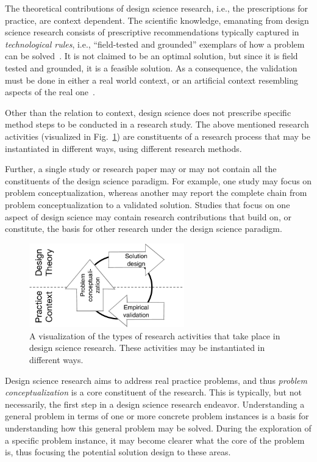 \documentclass[graybox]{svmult}
\begin{document}
The theoretical contributions of design science research, i.e., the prescriptions for practice, are context dependent. The scientific knowledge, emanating from design science research consists of prescriptive recommendations typically captured in \emph{technological rules}, i.e., ``field-tested and grounded'' exemplars of how a problem can be solved~\citep{van_aken_management_2004}. It is not claimed to be an optimal solution, but since it is field tested and grounded, it is a feasible solution.
As a consequence, the validation must be done in either a real world context, or an artificial context resembling aspects of the real one~\citep{wieringa_what_2014}.  

Other than the relation to context, design science does not prescribe specific method steps to be conducted in a research study. The above mentioned research activities (visualized in Fig.~\ref{fig:DS_process}) are constituents of a research process that may be instantiated in different ways, using different research methods. 

Further, a single study or research paper may or may not contain all the constituents of the design science paradigm. For example, one study may focus on problem conceptualization, whereas another may report the complete chain from problem conceptualization to a validated solution. Studies that focus on one aspect of design science may contain research contributions that build on, or constitute, the basis for other research under the design science paradigm.


\begin{figure}[t]
\centering
 \includegraphics[width=0.6\textwidth]{05_Runeson_DesignScience_Fig_1.pdf}
\caption{A visualization of the types of research activities that take place in design science research. These activities may be instantiated in different ways.}
\label{fig:DS_process}       %
\end{figure}


Design science research aims to address real practice problems, and thus \emph{problem conceptualization} is a core constituent of the research. This is typically, but not necessarily, the first step in a design science research endeavor. Understanding a general problem in terms of one or more concrete problem instances is a basis for understanding how this general problem may be solved. During the exploration of a specific problem instance, it may become clearer what the core of the problem is, thus focusing the potential solution design to these areas. 
\end{document}

